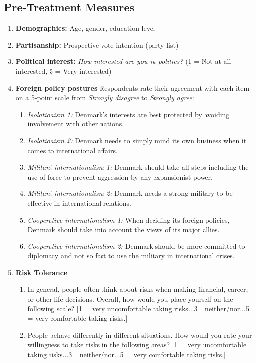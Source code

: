 \subsection{Pre-Treatment Measures}
\begin{enumerate}
    \item \textbf{Demographics:} Age, gender, education level
    \item \textbf{Partisanship:} Prospective vote intention (party list)
    \item \textbf{Political interest:} \textit{How interested are you in politics?} (1 = Not at all interested, 5 = Very interested)
    \item \textbf{Foreign policy postures} Respondents rate their agreement with each item on a 5-point scale from \textit{Strongly disagree} to \textit{Strongly agree}:
    \begin{enumerate}
        \item \textit{Isolationism 1:} Denmark's interests are best protected by avoiding involvement with other nations.
        \item \textit{Isolationism 2:} Denmark needs to simply mind its own business when it comes to international affairs.
        \item \textit{Militant internationalism 1:} Denmark should take all steps including the use of force to prevent aggression by any expansionist power.
        \item \textit{Militant internationalism 2:} Denmark needs a strong military to be effective in international relations.
        \item \textit{Cooperative internationalism 1:} When deciding its foreign policies, Denmark should take into account the views of its major allies.
        \item \textit{Cooperative internationalism 2:} Denmark should be more committed to diplomacy and not so fast to use the military in international crises.
    \end{enumerate}
    \item \textbf{Risk Tolerance}
    \begin{enumerate}
        \item In general, people often think about risks when making financial, career, or other life decisions. Overall, how would you place yourself on the following scale? [1 = very uncomfortable taking risks...3= neither/nor...5 = very comfortable taking risks.]
        \item People behave differently in different situations. How would you rate your willingness to take risks in the following areas? [1 = very uncomfortable taking risks...3= neither/nor...5 = very comfortable taking risks.]

\end{enumerate}
\end{enumerate}
